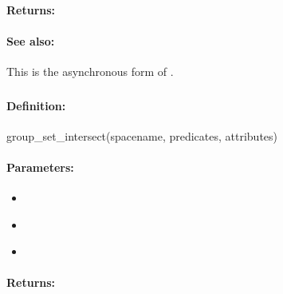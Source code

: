 \paragraph{Returns:}


\paragraph{See also:}  This is the asynchronous form of .

\pagebreak
\subsubsection{}
\label{api:ruby:group_set_intersect}


\paragraph{Definition:}
\begin{rubycode}
group_set_intersect(spacename, predicates, attributes)
\end{rubycode}

\paragraph{Parameters:}
\begin{itemize}[noitemsep]
\item {}\\

\item {}\\

\item {}\\

\end{itemize}

\paragraph{Returns:}


\pagebreak
\subsubsection{}
\label{api:ruby:async_group_set_intersect}


